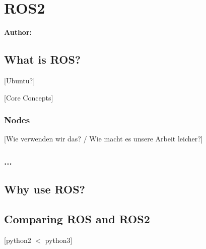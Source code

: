 \chapter{ROS2}

\textbf{Author: } 

\section{What is ROS?}
[Ubuntu?]

[Core Concepts]

\subsection{Nodes}
[Wie verwenden wir das? / Wie macht es unsere Arbeit leicher?]

\subsection{...}

\section{Why use ROS?}

\section{Comparing ROS and ROS2}
[python2 $<$ python3]

\filbreak